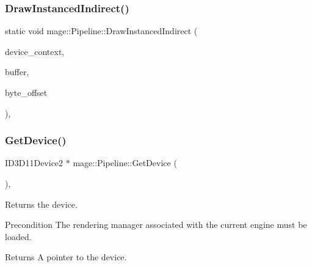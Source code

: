 \hypertarget{structmage_1_1_pipeline_a0386605c4c25f48e1f1a8730282c6f37}{}\label{structmage_1_1_pipeline_a0386605c4c25f48e1f1a8730282c6f37} 
\subsubsection{\texorpdfstring{Draw\+Instanced\+Indirect()}{DrawInstancedIndirect()}}
{\footnotesize\ttfamily static void mage\+::\+Pipeline\+::\+Draw\+Instanced\+Indirect (\begin{DoxyParamCaption}\item[{I\+D3\+D11\+Device\+Context2 $\ast$}]{device\+\_\+context,  }\item[{I\+D3\+D11\+Buffer $\ast$}]{buffer,  }\item[{\hyperlink{namespacemage_a41c104c036fba3756a74e19f793eeaa1}{U32}}]{byte\+\_\+offset }\end{DoxyParamCaption})\hspace{0.3cm}{\ttfamily [static]}, {\ttfamily [noexcept]}}

\hypertarget{structmage_1_1_pipeline_a5ee450d9d2a1dc333c7491a13376dca3}{}\label{structmage_1_1_pipeline_a5ee450d9d2a1dc333c7491a13376dca3} 
\subsubsection{\texorpdfstring{Get\+Device()}{GetDevice()}}
{\footnotesize\ttfamily I\+D3\+D11\+Device2 $\ast$ mage\+::\+Pipeline\+::\+Get\+Device (\begin{DoxyParamCaption}{ }\end{DoxyParamCaption})\hspace{0.3cm}{\ttfamily [static]}, {\ttfamily [noexcept]}}

Returns the device.

\begin{DoxyPrecond}{Precondition}
The rendering manager associated with the current engine must be loaded. 
\end{DoxyPrecond}
\begin{DoxyReturn}{Returns}
A pointer to the device. 
\end{DoxyReturn}
\hypertarget{structmage_1_1_pipeline_af3a32798924091ccd874121889338163}{}\label{structmage_1_1_pipeline_af3a32798924091ccd874121889338163} 
